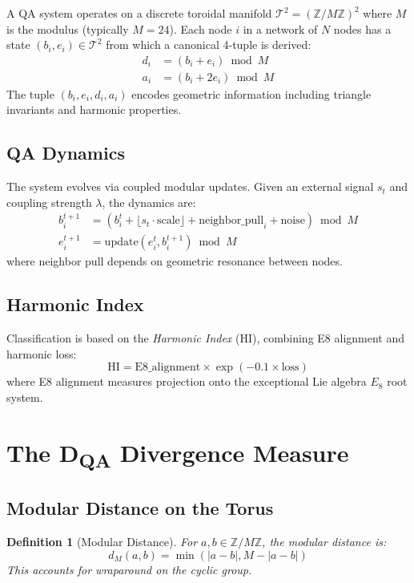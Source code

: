 \documentclass[11pt]{article}
\newtheorem{definition}[theorem]{Definition}
\theoremstyle{remark}
\begin{document}
A QA system operates on a discrete toroidal manifold $\mathcal{T}^2 = (\mathbb{Z}/M\mathbb{Z})^2$ where $M$ is the modulus (typically $M = 24$). Each node $i$ in a network of $N$ nodes has a state $(b_i, e_i) \in \mathcal{T}^2$ from which a canonical 4-tuple is derived:
\begin{align}
d_i &= (b_i + e_i) \bmod M \\
a_i &= (b_i + 2e_i) \bmod M
\end{align}
The tuple $(b_i, e_i, d_i, a_i)$ encodes geometric information including triangle invariants and harmonic properties.

\subsection{QA Dynamics}

The system evolves via coupled modular updates. Given an external signal $s_t$ and coupling strength $\lambda$, the dynamics are:
\begin{align}
b_i^{t+1} &= \left( b_i^t + \lfloor s_t \cdot \text{scale} \rfloor + \text{neighbor\_pull}_i + \text{noise} \right) \bmod M \\
e_i^{t+1} &= \text{update}(e_i^t, b_i^{t+1}) \bmod M
\end{align}
where neighbor pull depends on geometric resonance between nodes.

\subsection{Harmonic Index}

Classification is based on the \emph{Harmonic Index} (HI), combining E8 alignment and harmonic loss:
\begin{equation}
\text{HI} = \text{E8\_alignment} \times \exp(-0.1 \times \text{loss})
\end{equation}
where E8 alignment measures projection onto the exceptional Lie algebra $E_8$ root system.

\section{The D\textsubscript{QA} Divergence Measure}
\label{sec:divergence}

\subsection{Modular Distance on the Torus}

\begin{definition}[Modular Distance]
For $a, b \in \mathbb{Z}/M\mathbb{Z}$, the modular distance is:
\begin{equation}
d_M(a, b) = \min(|a - b|, M - |a - b|)
\end{equation}
This accounts for wraparound on the cyclic group.
\end{definition}
\end{document}

